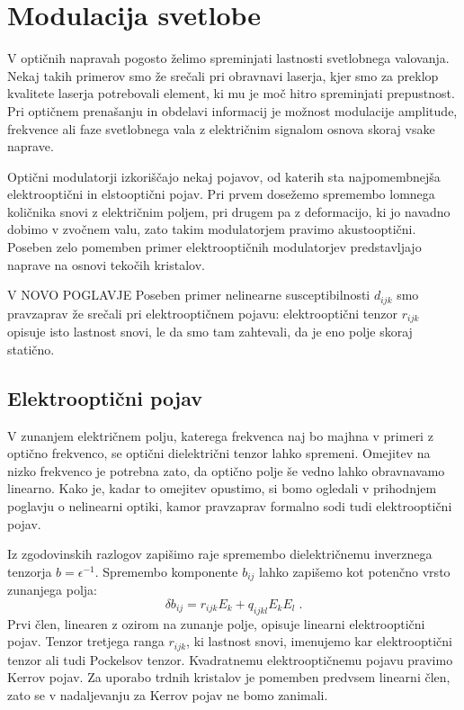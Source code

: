 
\chapter{Modulacija svetlobe}

V optičnih napravah pogosto želimo spreminjati lastnosti svetlobnega
valovanja. Nekaj takih primerov smo že srečali pri obravnavi laserja,
kjer smo za preklop kvalitete laserja potrebovali element, ki mu je
moč hitro spreminjati prepustnost. Pri optičnem prenašanju in obdelavi
informacij je možnost modulacije amplitude, frekvence ali faze svetlobnega
vala z električnim signalom osnova skoraj vsake naprave.

Optični modulatorji izkoriščajo nekaj pojavov, od katerih sta najpomembnejša
elektrooptični in elstooptični pojav. Pri prvem dosežemo spremembo
lomnega količnika snovi z električnim poljem, pri drugem pa z deformacijo,
ki jo navadno dobimo v zvočnem valu, zato takim modulatorjem pravimo
akustooptični. Poseben zelo pomemben primer elektrooptičnih modulatorjev
predstavljajo naprave na osnovi tekočih kristalov.





V NOVO POGLAVJE
Poseben primer nelinearne susceptibilnosti $d_{ijk}$ smo pravzaprav
že srečali pri elektrooptičnem pojavu: elektrooptični tenzor $r_{ijk}$
opisuje isto lastnost snovi, le da smo tam zahtevali, da je eno polje
skoraj statično. 


\section{Elektrooptični pojav}

V zunanjem električnem polju, katerega frekvenca naj bo majhna v primeri
z optično frekvenco, se optični dielektrični tenzor lahko spremeni.
Omejitev na nizko frekvenco je potrebna zato, da optično polje še
vedno lahko obravnavamo linearno. Kako je, kadar to omejitev opustimo,
si bomo ogledali v prihodnjem poglavju o nelinearni optiki, kamor
pravzaprav formalno sodi tudi elektrooptični pojav.

Iz zgodovinskih razlogov zapišimo raje spremembo dielektričnemu inverznega
tenzorja $b=\epsilon^{-1}$. Spremembo komponente $b_{ij}$ lahko
zapišemo kot potenčno vrsto zunanjega polja: 
\begin{equation}
\delta b_{ij}=r_{ijk}E_{k}+q_{ijkl}E_{k}E_{l}\;.\label{7.1}
\end{equation}
 Prvi člen, linearen z ozirom na zunanje polje, opisuje linearni elektrooptični
pojav. Tenzor tretjega ranga $r_{ijk}$, ki lastnost snovi, imenujemo
kar elektrooptični tenzor ali tudi Pockelsov tenzor. Kvadratnemu elektrooptičnemu
pojavu pravimo Kerrov pojav. Za uporabo trdnih kristalov je pomemben
predvsem linearni člen, zato se v nadaljevanju za Kerrov pojav ne
bomo zanimali.

